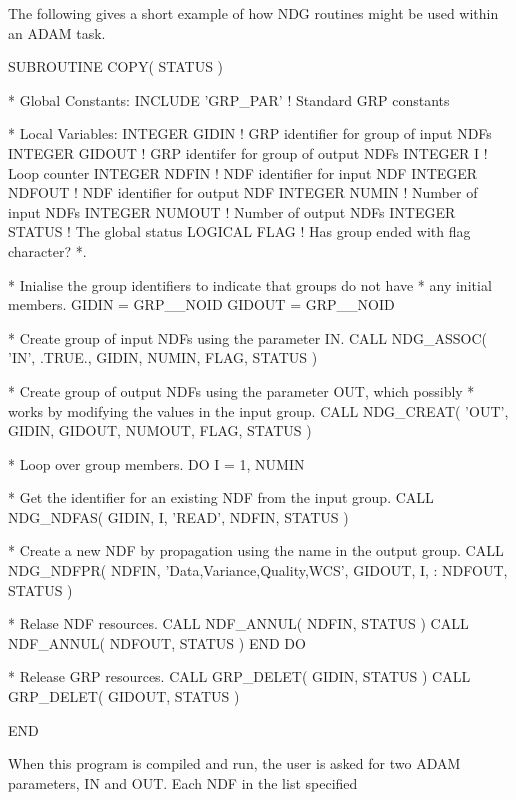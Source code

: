 \documentclass[twoside,11pt,nolof]{starlink}
\begin{document}
The following gives a short example of how NDG routines might be
used within an ADAM task.
\begin{small}
\begin{terminalv}
      SUBROUTINE COPY( STATUS )

*  Global Constants:
      INCLUDE 'GRP_PAR'          ! Standard GRP constants

*  Local Variables:
      INTEGER GIDIN              ! GRP identifier for group of input NDFs
      INTEGER GIDOUT             ! GRP identifer for group of output NDFs
      INTEGER I                  ! Loop counter
      INTEGER NDFIN              ! NDF identifier for input NDF
      INTEGER NDFOUT             ! NDF identifier for output NDF
      INTEGER NUMIN              ! Number of input NDFs
      INTEGER NUMOUT             ! Number of output NDFs
      INTEGER STATUS             ! The global status
      LOGICAL FLAG               ! Has group ended with flag character?
*.

*  Inialise the group identifiers to indicate that groups do not have
*  any initial members.
      GIDIN = GRP__NOID
      GIDOUT = GRP__NOID

*  Create group of input NDFs using the parameter IN.
      CALL NDG_ASSOC( 'IN', .TRUE., GIDIN, NUMIN, FLAG, STATUS )

*  Create group of output NDFs using the parameter OUT, which possibly
*  works by modifying the values in the input group.
      CALL NDG_CREAT( 'OUT', GIDIN, GIDOUT, NUMOUT, FLAG, STATUS )

*  Loop over group members.
      DO I = 1, NUMIN

*  Get the identifier for an existing NDF from the input group.
         CALL NDG_NDFAS( GIDIN, I, 'READ', NDFIN, STATUS )

*  Create a new NDF by propagation using the name in the output group.
         CALL NDG_NDFPR( NDFIN, 'Data,Variance,Quality,WCS', GIDOUT, I,
     :                   NDFOUT, STATUS )

*  Relase NDF resources.
         CALL NDF_ANNUL( NDFIN, STATUS )
         CALL NDF_ANNUL( NDFOUT, STATUS )
      END DO

*  Release GRP resources.
      CALL GRP_DELET( GIDIN, STATUS )
      CALL GRP_DELET( GIDOUT, STATUS )

      END
\end{terminalv}
\end{small}
When this program is compiled and run, the user is asked for
two ADAM parameters, IN and OUT.  Each NDF in the list specified
\end{document}
